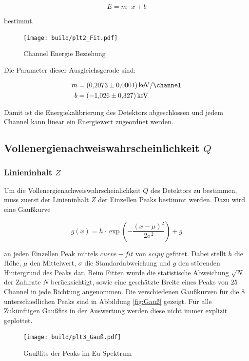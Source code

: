 \begin{equation}
	E=m \cdot x +b
\end{equation}

bestimmt.

\begin{figure}[H]
    \centering
    \texttt{[image: build/plt2\_Fit.pdf]}
	\caption{Channel Energie Beziehung}\label{fig:Eu_Fit}
\end{figure}

Die Parameter dieser Ausgleichsgerade sind:

\begin{align*}
	m&=\qty[per-mode=fraction]{0.2073(0.0001)}{\kilo\eV\per\channel}\\
	b&=\qty{-1.026(0.327)}{\kilo\eV}
\end{align*}

Damit ist die Energiekalibrierung des Detektors abgeschlossen und jedem Channel kann linear ein Energiewert zugeordnet werden. 

\subsection{Vollenergienachweiswahrscheinlichkeit $Q$}
\subsubsection{Linieninhalt $Z$}
Um die Vollenergienachweiswahrscheinlichkeit $Q$ des Detektors zu bestimmen, muss zuerst der Linieninhalt $Z$ der Einzellen Peaks bestimmt werden. 
Dazu wird eine Gaußkurve 

\begin{equation}
	g(x)=h\cdot \exp(-\frac{(x-\mu )^2}{2\sigma^2})+g
	\label{eq:Gauß}
\end{equation}

an jeden Einzellen Peak mittels $curve-fit$ von $scipy$ \cite{scipy} gefittet. 
Dabei stellt $h$ die Höhe, $\mu$ den Mittelwert, $\sigma$ die Standardabweichung und $g$ den störenden Hintergrund des Peaks dar. 
Beim Fitten wurde die statistische Abweichung $\sqrt{N}$ der Zahlrate $N$ berücksichtigt, 
sowie eine geschätzte Breite eines Peaks von $25$ Channel in jede Richtung angenommen. 
Die verschiedenen Gaußkurven für die 8 unterschiedlichen Peaks sind in Abbildung \eqref{fig:Gauß} gezeigt. 
Für alle Zukünftigen Gaußfits in der Auswertung werden diese nicht immer explizit geplottet. 

\begin{figure}
    \centering
    \texttt{[image: build/plt3\_Gauß.pdf]}
	\caption{Gaußfits der Peaks im Eu-Spektrum}
	\label{fig:Gauß}
\end{figure}

